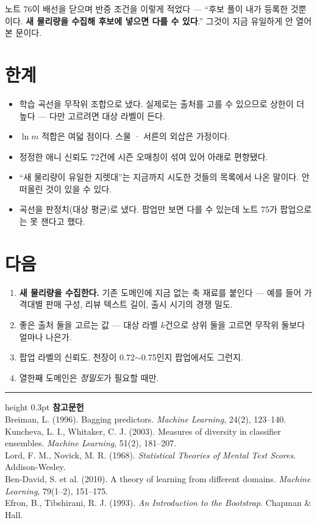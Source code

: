 \documentclass[10pt]{article}
\begin{document}
노트 76이 배선을 닫으며 반증 조건을 이렇게 적었다 --- ``후보 풀이 내가 등록한
것뿐이다. \textbf{새 물리량을 수집해 후보에 넣으면 다를 수 있다}.'' 그것이
지금 유일하게 안 열어 본 문이다.

\section{한계}

\begin{itemize}[leftmargin=1.1em,itemsep=0.15em]
\item 학습 곡선을 무작위 조합으로 냈다. 실제로는 출처를 고를 수 있으므로
      상한이 더 높다 --- 다만 고르려면 대상 라벨이 든다.
\item $\ln m$ 적합은 여덟 점이다. 스물 · 서른의 외삽은 가정이다.
\item 정정한 애니 신뢰도 72건에 시즌 오매칭이 섞여 있어 아래로 편향됐다.
\item ``새 물리량이 유일한 지렛대''는 지금까지 시도한 것들의 목록에서 나온
      말이다. 안 떠올린 것이 있을 수 있다.
\item 곡선을 판정치(대상 평균)로 냈다. 팝업만 보면 다를 수 있는데 노트 75가
      팝업으로는 못 잰다고 했다.
\end{itemize}

\section{다음}

\begin{enumerate}[leftmargin=1.3em,itemsep=0.15em]
\item \textbf{새 물리량을 수집한다.} 기존 도메인에 지금 없는 축 재료를 붙인다
      --- 예를 들어 가격대별 판매 구성, 리뷰 텍스트 길이, 출시 시기의 경쟁 밀도.
\item 좋은 출처 둘을 고르는 값 --- 대상 라벨 $k$건으로 상위 둘을 고르면
      무작위 둘보다 얼마나 나은가.
\item 팝업 라벨의 신뢰도. 천장이 0.72$\sim$0.75인지 팝업에서도 그런지.
\item 열한째 도메인은 \emph{정밀도}가 필요할 때만.
\end{enumerate}

\vspace{0.6em}
\hrule height 0.3pt
\vspace{0.5em}
{\footnotesize
\textbf{참고문헌}\\[0.3em]
Breiman, L. (1996). Bagging predictors. \emph{Machine Learning}, 24(2), 123--140.\\[0.15em]
Kuncheva, L. I., Whitaker, C. J. (2003). Measures of diversity in classifier
ensembles. \emph{Machine Learning}, 51(2), 181--207.\\[0.15em]
Lord, F. M., Novick, M. R. (1968). \emph{Statistical Theories of Mental Test
Scores}. Addison-Wesley.\\[0.15em]
Ben-David, S. et al. (2010). A theory of learning from different domains.
\emph{Machine Learning}, 79(1--2), 151--175.\\[0.15em]
Efron, B., Tibshirani, R. J. (1993). \emph{An Introduction to the Bootstrap}.
Chapman \& Hall.
}
\end{document}
